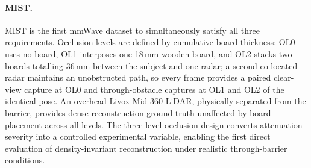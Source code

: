 \documentclass{article}
\begin{document}
\paragraph{MIST.}
MIST is the first mmWave dataset to simultaneously satisfy all three requirements.
Occlusion levels are defined by cumulative board thickness: OL0 uses no board,
OL1 interposes one 18\,mm wooden board, and OL2 stacks two boards totalling 36\,mm between
the subject and one radar; a second co-located radar maintains an unobstructed path, so
every frame provides a paired clear-view capture at OL0 and through-obstacle captures at OL1
and OL2 of the identical pose.
An overhead Livox Mid-360 LiDAR, physically separated from the barrier, provides dense
reconstruction ground truth unaffected by board placement across all levels.
The three-level occlusion design converts attenuation severity into a controlled experimental
variable, enabling the first direct evaluation of density-invariant reconstruction under
realistic through-barrier conditions.
\end{document}
